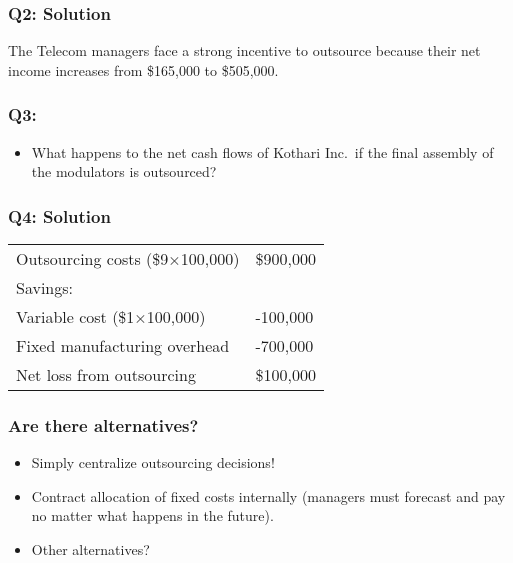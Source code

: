 \hypertarget{q2-solution-1}{%
\subsubsection{Q2: Solution}\label{q2-solution-1}}

The Telecom managers face a strong incentive to outsource because their
net income increases from \$165,000 to \$505,000.

\hypertarget{q3-1}{%
\subsubsection{Q3:}\label{q3-1}}

\begin{itemize}
\tightlist
\item
  What happens to the net cash flows of Kothari Inc.~if the final
  assembly of the modulators is outsourced?
\end{itemize}

\hypertarget{q4-solution-2}{%
\subsubsection{Q4: Solution}\label{q4-solution-2}}

\begin{longtable}[]{@{}ll@{}}
\toprule\noalign{}
\endhead
\bottomrule\noalign{}
\endlastfoot
Outsourcing costs {(\$9×100,000)} & \$900,000 \\
Savings: & \\
Variable cost {(\$1×100,000)} & -100,000 \\
Fixed manufacturing overhead & -700,000 \\
Net loss from outsourcing & \$100,000 \\
\end{longtable}

\hypertarget{are-there-alternatives}{%
\subsubsection{Are there alternatives?}\label{are-there-alternatives}}

\begin{itemize}
\tightlist
\item
  Simply centralize outsourcing decisions!
\item
  Contract allocation of fixed costs internally (managers must forecast
  and pay no matter what happens in the future).
\item
  Other alternatives?
\end{itemize}

